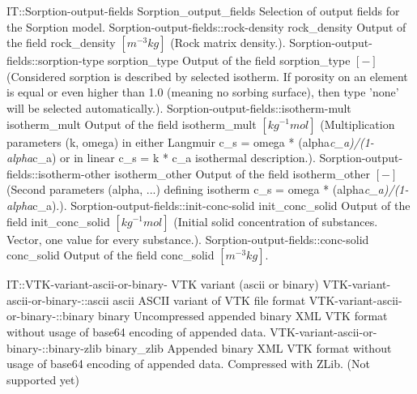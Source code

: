 \begin{SelectionType}
	{IT::Sorption-output-fields}
	{Sorption{\_}output{\_}fields}
	{{{Selection of output fields for the Sorption model.}}}
		\SelectionItem
			{Sorption-output-fields::rock-density}
			{rock{\_}density}
			{{{Output of the field rock{\_}density }{$[m^{-3}kg]$}{ (Rock matrix density.).}}}
		\SelectionItem
			{Sorption-output-fields::sorption-type}
			{sorption{\_}type}
			{{{Output of the field sorption{\_}type }{$[-]$}{ (Considered sorption is described by selected isotherm. If porosity on an element is equal or even higher than 1.0 (meaning no sorbing surface), then type 'none' will be selected automatically.).}}}
		\SelectionItem
			{Sorption-output-fields::isotherm-mult}
			{isotherm{\_}mult}
			{{{Output of the field isotherm{\_}mult }{$[kg^{-1}mol]$}{ (Multiplication parameters (k, omega) in either Langmuir c{\_}s = omega * (alpha}\textit{c{\_}a)/(1- alpha}{c{\_}a) or in linear c{\_}s = k * c{\_}a isothermal description.).}}}
		\SelectionItem
			{Sorption-output-fields::isotherm-other}
			{isotherm{\_}other}
			{{{Output of the field isotherm{\_}other }{$[-]$}{ (Second parameters (alpha, ...) defining isotherm  c{\_}s = omega * (alpha}\textit{c{\_}a)/(1- alpha}{c{\_}a).).}}}
		\SelectionItem
			{Sorption-output-fields::init-conc-solid}
			{init{\_}conc{\_}solid}
			{{{Output of the field init{\_}conc{\_}solid }{$[kg^{-1}mol]$}{ (Initial solid concentration of substances. Vector, one value for every substance.).}}}
		\SelectionItem
			{Sorption-output-fields::conc-solid}
			{conc{\_}solid}
			{{{Output of the field conc{\_}solid }{$[m^{-3}kg]$}{.}}}
\end{SelectionType}
\begin{SelectionType}
	{IT::VTK-variant-ascii-or-binary-}
	{VTK variant (ascii or binary)}
	{}
		\SelectionItem
			{VTK-variant-ascii-or-binary-::ascii}
			{ascii}
			{{{ASCII variant of VTK file format}}}
		\SelectionItem
			{VTK-variant-ascii-or-binary-::binary}
			{binary}
			{{{Uncompressed appended binary XML VTK format without usage of base64 encoding of appended data.}}}
		\SelectionItem
			{VTK-variant-ascii-or-binary-::binary-zlib}
			{binary{\_}zlib}
			{{{Appended binary XML VTK format without usage of base64 encoding of appended data. Compressed with ZLib. (Not supported yet)}}}
\end{SelectionType}
